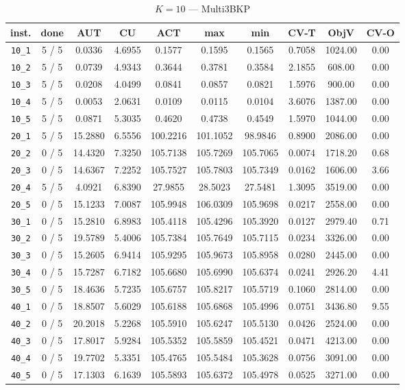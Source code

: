 \begin{table}[h!]
\begin{center}
\small
\begin{tabular}{| c | c | c | c | c | c | c | c | c | c |}
\hline
inst. & done & AUT & CU & ACT & max & min & CV-T & ObjV & CV-O \\
\hline
\verb|10_1| & 5 / 5 & 0.0336 & 4.6955 & 0.1577 & 0.1595 & 0.1565 & 0.7058 & 1024.00 & 0.00\\ 
\verb|10_2| & 5 / 5 & 0.0739 & 4.9343 & 0.3644 & 0.3781 & 0.3584 & 2.1855 & 608.00 & 0.00\\ 
\verb|10_3| & 5 / 5 & 0.0208 & 4.0499 & 0.0841 & 0.0857 & 0.0821 & 1.5976 & 900.00 & 0.00\\ 
\verb|10_4| & 5 / 5 & 0.0053 & 2.0631 & 0.0109 & 0.0115 & 0.0104 & 3.6076 & 1387.00 & 0.00\\ 
\verb|10_5| & 5 / 5 & 0.0871 & 5.3035 & 0.4620 & 0.4738 & 0.4549 & 1.5970 & 1044.00 & 0.00\\ 
\verb|20_1| & 5 / 5 & 15.2880 & 6.5556 & 100.2216 & 101.1052 & 98.9846 & 0.8900 & 2086.00 & 0.00\\ 
\verb|20_2| & 0 / 5 & 14.4320 & 7.3250 & 105.7138 & 105.7269 & 105.7065 & 0.0074 & 1718.20 & 0.68\\ 
\verb|20_3| & 0 / 5 & 14.6367 & 7.2252 & 105.7527 & 105.7803 & 105.7349 & 0.0162 & 1606.00 & 3.66\\ 
\verb|20_4| & 5 / 5 & 4.0921 & 6.8390 & 27.9855 & 28.5023 & 27.5481 & 1.3095 & 3519.00 & 0.00\\ 
\verb|20_5| & 0 / 5 & 15.1233 & 7.0087 & 105.9948 & 106.0309 & 105.9698 & 0.0217 & 2558.00 & 0.00\\ 
\verb|30_1| & 0 / 5 & 15.2810 & 6.8983 & 105.4118 & 105.4296 & 105.3920 & 0.0127 & 2979.40 & 0.71\\ 
\verb|30_2| & 0 / 5 & 19.5789 & 5.4006 & 105.7384 & 105.7649 & 105.7115 & 0.0234 & 3326.00 & 0.00\\ 
\verb|30_3| & 0 / 5 & 15.2605 & 6.9414 & 105.9295 & 105.9673 & 105.8958 & 0.0280 & 2445.00 & 0.00\\ 
\verb|30_4| & 0 / 5 & 15.7287 & 6.7182 & 105.6680 & 105.6990 & 105.6374 & 0.0241 & 2926.20 & 4.41\\ 
\verb|30_5| & 0 / 5 & 18.4636 & 5.7235 & 105.6757 & 105.8217 & 105.5719 & 0.1060 & 2814.00 & 0.00\\ 
\verb|40_1| & 0 / 5 & 18.8507 & 5.6029 & 105.6188 & 105.6868 & 105.4996 & 0.0751 & 3436.80 & 9.55\\ 
\verb|40_2| & 0 / 5 & 20.2018 & 5.2268 & 105.5910 & 105.6247 & 105.5130 & 0.0426 & 2524.00 & 0.00\\ 
\verb|40_3| & 0 / 5 & 17.8017 & 5.9284 & 105.5352 & 105.5859 & 105.4521 & 0.0471 & 4213.00 & 0.00\\ 
\verb|40_4| & 0 / 5 & 19.7702 & 5.3351 & 105.4765 & 105.5484 & 105.3628 & 0.0756 & 3091.00 & 0.00\\ 
\verb|40_5| & 0 / 5 & 17.1303 & 6.1639 & 105.5893 & 105.6372 & 105.4978 & 0.0525 & 3271.00 & 0.00\\ 
\hline
\end{tabular}
\caption{$K = 10$ --- Multi3BKP}
\label{table:multi:10}
\end{center}
\end{table}

